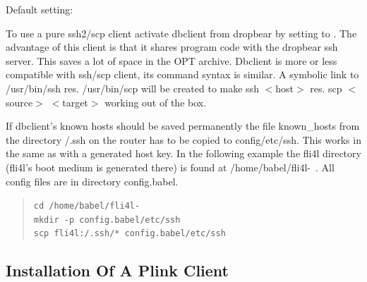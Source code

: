 \begin{description}


  Default setting: 

  To use a pure ssh2/scp client activate dbclient from dropbear by 
  setting  to . The advantage of this client 
  is that it shares program code with the dropbear ssh server. 
  This saves a lot of space in the OPT archive. Dbclient is more or less 
  compatible with ssh/scp client, its command syntax is similar. A symbolic link 
  to /usr/bin/ssh res. /usr/bin/scp will be created to make ssh $<$host$>$ 
  res. scp $<$source$>$ $<$target$>$ working out of the box.

  If dbclient's known hosts should be saved permanently the file 
  known\_hosts from the directory /.ssh on the router has to be copied 
  to config/etc/ssh. This works in the same as with a generated host key. 
  In the following example the fli4l directory (fli4l's boot medium is 
  generated there) is found at /home/babel/fli4l-\version~. All config 
  files are in directory config.babel.

\begin{example}
\begin{verse}
\texttt{cd /home/babel/fli4l-\version}\\
\texttt{mkdir -p config.babel/etc/ssh}\\
\texttt{scp fli4l:/.ssh/* config.babel/etc/ssh}
\end{verse}
\end{example}

\end{description}

\subsection {Installation Of A Plink Client}

